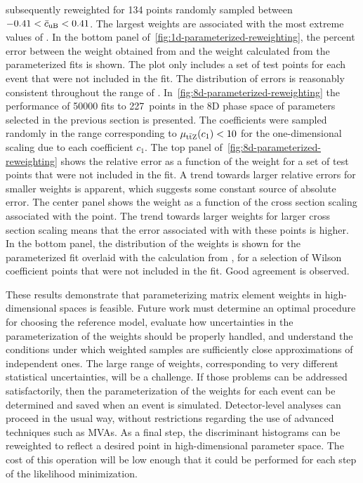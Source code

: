 subsequently reweighted for \num{134} points randomly sampled between $-0.41 <
\bar{c}_{\text{uB}} < 0.41$. The largest weights are associated with the most extreme values of
\cuB. In the bottom panel of~\cref{fig:1d-parameterized-reweighting}, the
percent error between the weight obtained from \madgraph and the weight
calculated from the parameterized fits is shown. The plot only includes a set of
test points for each event that were not included in the fit. The distribution
of errors is reasonably consistent throughout the range of \cuB.
In~\cref{fig:8d-parameterized-reweighting} the performance of \num{50000} fits
to \SI{227}{points} in the 8D phase space of parameters selected in the previous
section is presented. The coefficients were sampled randomly in the range
corresponding to $\mu_{\text{t}\bar{\text{t}}\text{Z}}(c_1) < 10$ for the one-dimensional scaling due to
each coefficient $c_1$. The top panel of~\cref{fig:8d-parameterized-reweighting}
shows the relative error as a function of the weight for a set of test points
that were not included in the fit. A trend towards larger relative errors for
smaller weights is apparent, which suggests some constant source of absolute
error. The center panel shows the weight as a function of the cross section
scaling associated with the point. The trend towards larger weights for larger
cross section scaling means that the error associated with with these points is
higher. In the bottom panel, the distribution of the weights is shown for the
parameterized fit overlaid with the calculation from \madgraph, for a selection
of Wilson coefficient points that were not included in the fit. Good agreement
is observed.

These results demonstrate that parameterizing matrix element weights in
high-dimensional spaces is feasible. Future work must determine an optimal
procedure for choosing the reference model, evaluate how uncertainties in the
parameterization of the weights should be properly handled, and understand the
conditions under which weighted samples are sufficiently close approximations of
independent ones. The large range of weights, corresponding to very different
statistical uncertainties, will be a challenge. If those problems can be
addressed satisfactorily, then the parameterization of the weights for each
event can be determined and saved when an event is simulated. Detector-level
analyses can proceed in the usual way, without restrictions regarding the use of
advanced techniques such as MVAs. As a final step, the discriminant histograms
can be reweighted to reflect a desired point in high-dimensional parameter
space. The cost of this operation will be low enough that it could be performed
for each step of the likelihood minimization.

